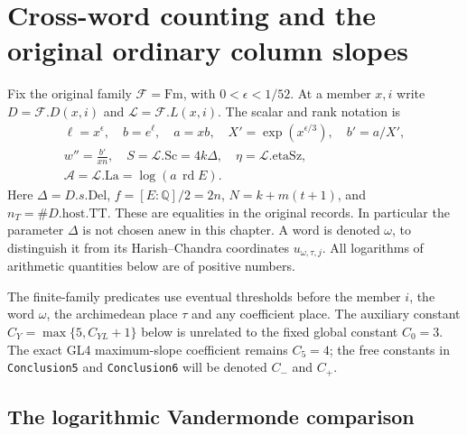 \section{Cross-word counting and the original ordinary column slopes}
\label{sec:global-count}


Fix the original family $\mathcal F=\mathrm{Fm}$, with
$0<\epsilon<1/52$. At a member $x,i$ write $D=\mathcal F.D(x,i)$
and $\mathcal L=\mathcal F.L(x,i)$. The scalar and rank notation is
\[
 \begin{gathered}
 \ell=x^\epsilon,\quad b=e^\ell,\quad a=xb,\quad
 X'=\exp(x^{\epsilon/3}),\quad b'=a/X',\\
 w''=\frac{b'}{xn},\quad S=\mathcal L.\mathrm{Sc}=4k\Delta,\quad
 \eta=\mathcal L.\mathrm{etaSz},\\
 \mathcal A=\mathcal L.\mathrm{La}=\log(a\,\operatorname{rd}E).
 \end{gathered}\tag{GVC.1}
\]
Here $\Delta=D.s.\mathrm{Del}$, $f=[E:\mathbb Q]/2=2n$,
$N=k+m(t+1)$, and $n_T=\#D.\mathrm{host}.\mathrm{TT}$.
These are equalities in the original records. In particular the
parameter $\Delta$ is not chosen anew in this chapter.
A word is denoted $\omega$, to distinguish it from its
Harish--Chandra coordinates $u_{\omega,\tau,j}$.
All logarithms of arithmetic quantities below are of positive numbers.

The finite-family predicates use eventual thresholds before the member
$i$, the word $\omega$, the archimedean place $\tau$ and any
coefficient place. The auxiliary constant
$C_Y=\max\{5,C_{YL}+1\}$ below is unrelated to the fixed global
constant $C_0=3$. The exact GL4 maximum-slope coefficient remains
$C_5=4$; the free constants in \texttt{Conclusion5} and
\texttt{Conclusion6} will be denoted $C_-$ and $C_+$.

\subsection{The logarithmic Vandermonde comparison}

